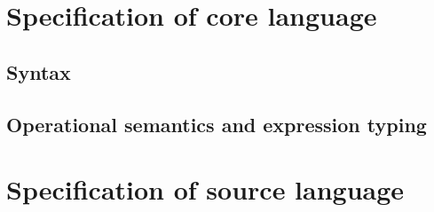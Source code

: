 \section{Specification of core language}

\newcommand{\FV}{\mathsf{FV}}
\newcommand{\dom}{\mathsf{dom}}

\subsection{Syntax}
\gram{\otte\ottinterrule
        \otts\ottinterrule
        \ottG\ottinterrule
        \ottv}

\subsection{Operational semantics and expression typing}
\ottdefnstep{}
\ottusedrule{\ottdruleSXXMu{}}
\ottdefnexpr{}
\ottusedrule{\ottdruleTXXMu{}}

\section{Specification of source language}
